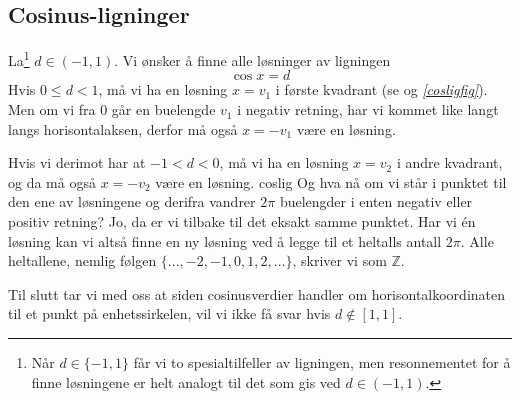 \subsection{Cosinus-ligninger}
La\footnote{Når $ {d\in\{-1, 1\}} $ får vi to spesialtilfeller av ligningen, men resonnementet for å finne løsningene er helt analogt til det som gis ved $ {d\in(-1, 1)} $.} $ {d\in(-1, 1)} $. Vi ønsker å finne alle løsninger av ligningen
\[ \cos x=d \label{cosslig} \]
Hvis $ {0\leq d <1}$, må vi ha en løsning $ {x=v_1} $ i første kvadrant (se  og \textsl{\ref{cosligfig}}). Men om vi fra 0 går en buelengde $ v_1 $ i negativ retning, har vi kommet like langt langs horisontalaksen, derfor må også $ {x=-v_1} $ være en løsning.\vsk

Hvis vi derimot har at $ {-1< d<0} $, må vi ha en løsning $ {x=v_2} $ i andre kvadrant, og da må også ${ x=-v_2} $ være en løsning.
{coslig}
Og hva nå om vi står i punktet til den ene av løsningene og derifra vandrer $ 2\pi $ buelengder i enten negativ eller positiv retning? Jo, da er vi tilbake til det eksakt samme punktet. Har vi én løsning kan vi altså finne en ny løsning ved å legge til et heltalls antall $ 2\pi $. Alle heltallene, nemlig følgen $ \{...,-2, -1, 0, 1, 2, ... \} $, skriver vi som $ \mathbb{Z} $.\vsk

Til slutt tar vi med oss at siden cosinusverdier handler om horisontalkoordinaten til et punkt på enhetssirkelen, vil vi ikke få svar hvis $ {d\not \in [1,1]} $.\regv

